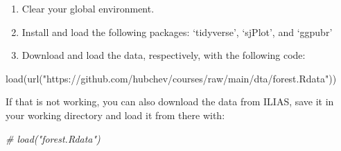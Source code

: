 \documentclass[
  12pt,
  oneside]{book}
\newenvironment{Shaded}{\begin{snugshade}}{\end{snugshade}}
\newcommand{\CommentTok}[1]{\textcolor[rgb]{0.56,0.35,0.01}{\textit{#1}}}
\newcommand{\FunctionTok}[1]{\textcolor[rgb]{0.00,0.00,0.00}{#1}}
\newcommand{\NormalTok}[1]{#1}
\newcommand{\StringTok}[1]{\textcolor[rgb]{0.31,0.60,0.02}{#1}}
\theoremstyle{definition}
\theoremstyle{definition}
\theoremstyle{definition}
\theoremstyle{definition}
\theoremstyle{remark}
\begin{document}
\begin{enumerate}
\def\labelenumi{(\arabic{enumi})}
\setcounter{enumi}{1}
\item
  Clear your global environment.
\item
  Install and load the following packages: `tidyverse', `sjPlot', and `ggpubr'
\item
  Download and load the data, respectively, with the following code:
\end{enumerate}

\begin{Shaded}
\begin{Highlighting}[]
\FunctionTok{load}\NormalTok{(}\FunctionTok{url}\NormalTok{(}\StringTok{"https://github.com/hubchev/courses/raw/main/dta/forest.Rdata"}\NormalTok{))}
\end{Highlighting}
\end{Shaded}

If that is not working, you can also download the data from ILIAS, save it in
your working directory and load it from there with:

\begin{Shaded}
\begin{Highlighting}[]
\CommentTok{\# load("forest.Rdata")}
\end{Highlighting}
\end{Shaded}
\end{document}
